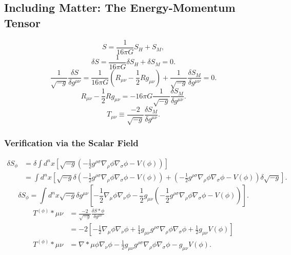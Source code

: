 \documentclass[11pt, a4paper]{report}
\begin{document}
\subsection{Including Matter: The Energy-Momentum Tensor}
\begin{equation}
\label{eq:total_action}
S = \frac{1}{16\pi G} S_{H} + S_{M},
\end{equation}
\begin{equation}
\delta S = \frac{1}{16\pi G} \delta S_{H} + \delta S_{M} = 0.
\end{equation}
\begin{equation}
\frac{1}{\sqrt{-g}} \frac{\delta S}{\delta g^{\mu\nu}} = \frac{1}{16\pi G} \left( R_{\mu\nu} - \frac{1}{2}R g_{\mu\nu} \right) + \frac{1}{\sqrt{-g}} \frac{\delta S_{M}}{\delta g^{\mu\nu}} = 0.
\end{equation}
\begin{equation}
R_{\mu\nu} - \frac{1}{2}R g_{\mu\nu} = -16\pi G \frac{1}{\sqrt{-g}} \frac{\delta S_{M}}{\delta g^{\mu\nu}}.
\end{equation}
\begin{equation}
\label{eq:hilbert_stress_energy}
T_{\mu\nu} \equiv \frac{-2}{\sqrt{-g}} \frac{\delta S_{M}}{\delta g^{\mu\nu}}.
\end{equation}

\subsubsection*{Verification via the Scalar Field}
\begin{align}
\delta S_{\phi} &= \delta \int d^{n}x \left[ \sqrt{-g} \left( -\frac{1}{2}g^{\rho\sigma}\nabla_{\rho}\phi\nabla_{\sigma}\phi - V(\phi) \right) \right] \nonumber \\
&= \int d^{n}x \left[ \sqrt{-g} \delta \left( -\frac{1}{2}g^{\rho\sigma}\nabla_{\rho}\phi\nabla_{\sigma}\phi - V(\phi) \right) + \left( -\frac{1}{2}g^{\rho\sigma}\nabla_{\rho}\phi\nabla_{\sigma}\phi - V(\phi) \right) \delta\sqrt{-g} \right].
\end{align}
\begin{equation}
\delta S_{\phi} = \int d^{n}x \sqrt{-g} \delta g^{\mu\nu} \left[ -\frac{1}{2}\nabla_{\mu}\phi\nabla_{\nu}\phi - \frac{1}{2}g_{\mu\nu} \left( -\frac{1}{2}g^{\rho\sigma}\nabla_{\rho}\phi\nabla_{\sigma}\phi - V(\phi) \right) \right].
\end{equation}
\begin{align}
T^{(\phi)}*{\mu\nu} &= \frac{-2}{\sqrt{-g}} \frac{\delta S*{\phi}}{\delta g^{\mu\nu}} \nonumber \\
&= -2 \left[ -\frac{1}{2}\nabla_{\mu}\phi\nabla_{\nu}\phi + \frac{1}{4}g_{\mu\nu}g^{\rho\sigma}\nabla_{\rho}\phi\nabla_{\sigma}\phi + \frac{1}{2}g_{\mu\nu}V(\phi) \right] \nonumber \\
T^{(\phi)}*{\mu\nu} &= \nabla*{\mu}\phi\nabla_{\nu}\phi - \frac{1}{2}g_{\mu\nu}g^{\rho\sigma}\nabla_{\rho}\phi\nabla_{\sigma}\phi - g_{\mu\nu}V(\phi).
\end{align}
\end{document}
